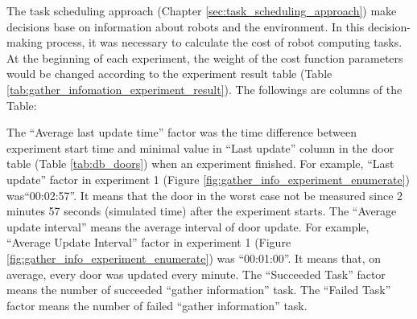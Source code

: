 \begin{table}
\caption{Example result of gather information experiment. The values of the first three columns (weight parameters) were set before the simulation experiment was started, and the values of other columns were filled after the simulation experiment.}
\label{tab:gather_infomation_experiment_result}
\end{table}

The task scheduling approach (Chapter \ref{sec:task_scheduling_approach}) make decisions base on information about robots and the environment. In this decision-making process, it was necessary to calculate the cost of robot computing tasks. At the beginning of each experiment, the weight of the cost function parameters would be changed according to the experiment result table (Table \ref{tab:gather_infomation_experiment_result}). The followings are columns of the Table:

The ``Average last update time'' factor was the time difference between experiment start time and minimal value in ``Last update'' column in the door table (Table \ref{tab:db_doors}) when an experiment finished. For example, ``Last update'' factor in experiment 1 (Figure \ref{fig:gather_info_experiment_enumerate}) was``00:02:57''. It means that the door in the worst case not be measured since 2 minutes 57 seconds (simulated time) after the experiment starts. The ``Average update interval'' means the average interval of door update. For example, ``Average Update Interval'' factor in experiment 1 (Figure \ref{fig:gather_info_experiment_enumerate}) was ``00:01:00''. It means that, on average, every door was updated every minute. The ``Succeeded Task'' factor means the number of succeeded ``gather information'' task. The ``Failed Task'' factor means the number of failed ``gather information'' task.



